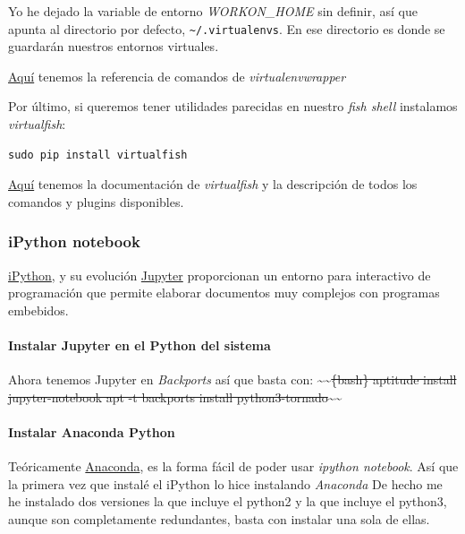 \documentclass[12pt,spanish,]{scrartcl}
\let\oldparagraph\paragraph
\renewcommand{\paragraph}[1]{\oldparagraph{#1}\mbox{}}
\begin{document}
Yo he dejado la variable de entorno \emph{WORKON\_HOME} sin definir, así
que apunta al directorio por defecto,
\texttt{\textasciitilde{}/.virtualenvs}. En ese directorio es donde se
guardarán nuestros entornos virtuales.

\href{http://virtualenvwrapper.readthedocs.io/en/latest/command_ref.html}{Aquí}
tenemos la referencia de comandos de \emph{virtualenvwrapper}

Por último, si queremos tener utilidades parecidas en nuestro \emph{fish
shell} instalamos \emph{virtualfish}:

\begin{verbatim}
sudo pip install virtualfish
\end{verbatim}

\href{http://virtualfish.readthedocs.io/en/latest/index.html}{Aquí}
tenemos la documentación de \emph{virtualfish} y la descripción de todos
los comandos y plugins disponibles.

\hypertarget{ipython-notebook}{%
\subsubsection{iPython notebook}\label{ipython-notebook}}

\href{https://ipython.org/}{iPython}, y su evolución
\href{https://jupyter.org/index.html}{Jupyter} proporcionan un entorno
para interactivo de programación que permite elaborar documentos muy
complejos con programas embebidos.

\hypertarget{instalar-jupyter-en-el-python-del-sistema}{%
\paragraph{Instalar Jupyter en el Python del
sistema}\label{instalar-jupyter-en-el-python-del-sistema}}

Ahora tenemos Jupyter en \emph{Backports} así que basta con:
\textasciitilde{}\textasciitilde{}\sout{\{bash\} aptitude install
jupyter-notebook apt -t backports install
python3-tornado}\textasciitilde{}\textasciitilde{}

\hypertarget{instalar-anaconda-python}{%
\paragraph{Instalar Anaconda Python}\label{instalar-anaconda-python}}

Teóricamente \href{https://www.continuum.io/downloads}{Anaconda}, es la
forma fácil de poder usar \emph{ipython notebook}. Así que la primera
vez que instalé el iPython lo hice instalando \emph{Anaconda} De hecho
me he instalado dos versiones la que incluye el python2 y la que incluye
el python3, aunque son completamente redundantes, basta con instalar una
sola de ellas.
\end{document}

